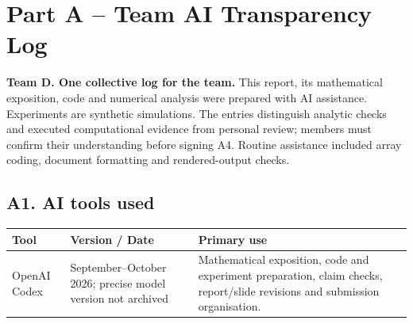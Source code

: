 \section{Part A -- Team AI Transparency Log}
\label{app:ai}
\textbf{Team D. One collective log for the team.} This report, its mathematical exposition, code and numerical analysis were prepared with AI assistance. Experiments are synthetic simulations. The entries distinguish analytic checks and executed computational evidence from personal review; members must confirm their understanding before signing A4. Routine assistance included array coding, document formatting and rendered-output checks.

\subsection*{A1. AI tools used}
\begingroup\small\setlength{\tabcolsep}{4pt}
\begin{longtable}{@{}p{.22\linewidth}p{.26\linewidth}p{.47\linewidth}@{}}\toprule
Tool & Version / Date & Primary use\\\midrule\endhead
OpenAI Codex & September--October 2026; precise model version not archived & Mathematical exposition, code and experiment preparation, claim checks, report/slide revisions and submission organisation.\\[6pt]
\bottomrule
\end{longtable}\endgroup

